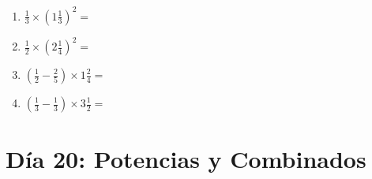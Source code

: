 \documentclass[12pt]{article}
\begin{document}
\begin{enumerate}
\item \large $ \frac{1}{3} \times \left( 1 \frac{1}{3} \right)^2 = $ \vspace{1.6cm}
\item \large $ \frac{1}{2} \times \left( 2 \frac{1}{4} \right)^2 = $ \vspace{1.6cm}
\item \large $ \left( \frac{1}{2} - \frac{2}{5} \right) \times 1 \frac{2}{4} = $ \vspace{1.6cm}
\item \large $ \left( \frac{1}{3} - \frac{1}{3} \right) \times 3 \frac{1}{2} = $ \vspace{1.6cm}
\end{enumerate}\newpage
\section*{Día 20: Potencias y Combinados}
\end{document}
